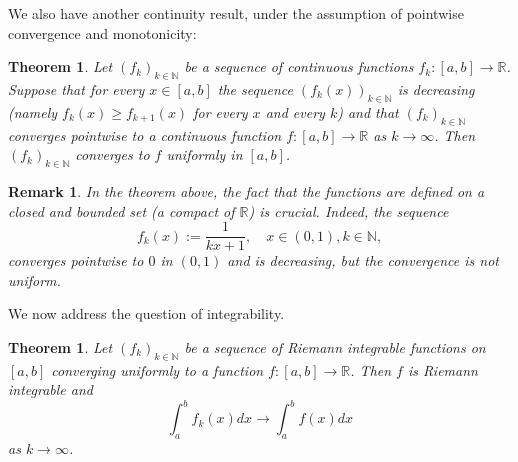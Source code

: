 \documentclass[a4paper,reqno]{amsart}
\numberwithin{equation}{section}
\newtheorem{theorem}[definition]{Theorem}
\newtheorem{remark}[definition]{Remark}
\def\N{\mathbb{N}}
\def\R{\mathbb{R}}
\begin{document}
We also have another continuity result, under the assumption of pointwise convergence and monotonicity:


\begin{theorem}\label{pointwisemonotone}
Let $(f_k)_{k\in \mathbb{N}}$ be a sequence of continuous functions $f_k:[a,b]\to \R$. Suppose that for every $x\in [a,b]$ the sequence $(f_k(x))_{k\in \N}$ is decreasing (namely $f_k(x)\geq f_{k+1}(x)$ for every $x$ and every $k$) and that $(f_k)_{k\in \N}$ converges pointwise to a continuous function $f:[a,b]\to \R$ as $k\to \infty$. Then $(f_k)_{k\in \N}$ converges to $f$ uniformly in $[a,b]$.
\end{theorem}

\begin{remark}
In the theorem above, the fact that the functions are defined on a closed and bounded set (a compact of $\R$) is crucial. Indeed, the sequence 
$$
f_k(x):= \frac{1}{kx+1}, \quad x\in (0,1), k\in \N,
$$
converges pointwise to $0$ in $(0,1)$ and is decreasing, but the convergence is not uniform.
\end{remark}


We now address the question of integrability.


\begin{theorem}\label{limit:integral}
Let $(f_k)_{k\in \mathbb{N}}$ be a sequence of Riemann integrable functions on $[a,b]$ converging uniformly to a function $f : [a,b] \to \R$. Then $f$ is Riemann integrable and
$$
\int_a^b f_k(x)dx \to \int_a^b f(x)dx
$$
as $k \to \infty$.
\end{theorem}
\end{document}
